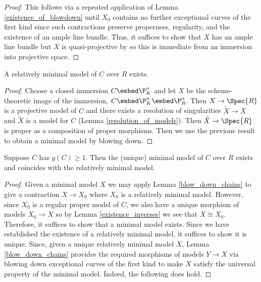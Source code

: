 \begin{proof}
This follows via a repeated application of Lemma \ref{existence_of_blowdown} until $X_0$ contains no further exceptional curves of the first kind since such contractions preserve properness, regularity, and the existence of an ample line bundle. Thus, it suffices to show that $X$ has an ample line bundle but $X$ is quasi-projective by \cite[\href{https://stacks.math.columbia.edu/tag/0C5N}{Tag 0C5N}]{stacks-project} so this is immediate from an immersion into projective space.
\end{proof}


\begin{proposition}
A relatively minimal model of $C$ over $R$ exists.
\end{proposition}

\begin{proof}
Choose a closed immersion $C \embed \P^n_K$ and let $X$ be the scheme-theoretic image of the immersion, $C \embed \P^n_K \embed \P^n_R$. Then $X \to \Spec{R}$ is a projective model of $C$ and there exists a resolution of singularities $\tilde{X} \to X$ and $\tilde{X}$ is a model for $C$ (Lemma \ref{resolution_of_models}). Then $\tilde{X} \to \Spec{R}$ is proper as a composition of proper morphisms. Then we use the previous result to obtain a minimal model by blowing down.  
\end{proof}

\begin{prop} \label{existence_and_uniqueness_min_model}
Suppose $C$ has $g(C) \ge 1$. Then the (unique) minimal model of $C$ over $R$ exists and coincides with the relatively minimal model.
\end{prop}

\begin{proof}
Given a minimal model $X$ we may apply Lemma \ref{blow_down_chains} to give a contraction $X \to X_0$ where $X_0$ is a relatively minimal model. However, since $X_0$ is a regular proper model of $C$, we also have a unique morphism of models $X_0 \to X$ so by Lemma \ref{existence_inverses} we see that $X \cong X_0$. Therefore, it suffices to show that a minimal model exists. Since we have established the existence of a relatively minimal model, it suffices to show it is unique. Since, given a unique relatively minimal model $X$, Lemma \ref{blow_down_chains} provides the required morphisms of models $Y \to X$ via blowing down exceptional curves of the first kind to make $X$ satisfy the universal property of the minimal model. Indeed, the following does hold.
\end{proof}


